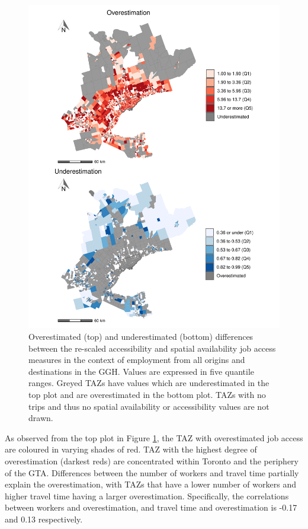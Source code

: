 \documentclass[]{elsarticle} %
\begin{document}
\begin{figure}
\includegraphics[width=1\linewidth]{Spatial-Availability_files/figure-latex/plot-difference-GGH-1} \caption{\label{fig:plot-difference-GGH}Overestimated (top) and underestimated (bottom) differences between the re-scaled accessibility and spatial availability job access measures in the context of employment from all origins and destinations in the GGH. Values are expressed in five quantile ranges. Greyed TAZs have values which are underestimated in the top plot and are overestimated in the bottom plot. TAZs with no trips and thus no spatial availability or accessibility values are not drawn.}\label{fig:plot-difference-GGH}
\end{figure}

As observed from the top plot in Figure \ref{fig:plot-difference-GGH},
the TAZ with overestimated job access are coloured in varying shades of
red. TAZ with the highest degree of overestimation (darkest reds) are
concentrated within Toronto and the periphery of the GTA. Differences
between the number of workers and travel time partially explain the
overestimation, with TAZs that have a lower number of workers and higher
travel time having a larger overestimation. Specifically, the
correlations between workers and overestimation, and travel time and
overestimation is -0.17 and 0.13 respectively.
\end{document}
